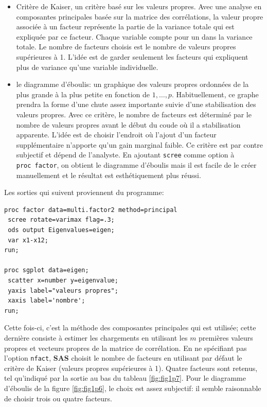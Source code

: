 \documentclass[
  11pt,
  letterpaper,
]{book}
\providecommand{\tightlist}{%
  \setlength{\itemsep}{0pt}\setlength{\parskip}{0pt}}
\theoremstyle{definition}
\theoremstyle{definition}
\theoremstyle{definition}
\theoremstyle{remark}
\begin{document}
\begin{itemize}
\tightlist
\item
  Critère de Kaiser, un critère basé sur les valeurs propres. Avec une analyse en composantes principales basée sur la matrice des corrélations, la valeur propre associée à un facteur représente la partie de la variance totale qui est expliquée par ce facteur. Chaque variable compte pour un dans la variance totale. Le nombre de facteurs choisis est le nombre de valeurs propres supérieures à 1. L'idée est de garder seulement les facteurs qui expliquent plus de variance qu'une variable individuelle.
\item
  le diagramme d'éboulis: un graphique des valeurs propres ordonnées de la plus grande à la plus petite en fonction de \(1, \ldots, p\). Habituellement, ce graphe prendra la forme d'une chute assez importante suivie d'une stabilisation des valeurs propres. Avec ce critère, le nombre de facteurs est déterminé par le nombre de valeurs propres avant le début du coude où il a stabilisation apparente. L'idée est de choisir l'endroit où l'ajout d'un facteur supplémentaire n'apporte qu'un gain marginal faible. Ce critère est par contre subjectif et dépend de l'analyste. En ajoutant \texttt{scree} comme option à \texttt{proc\ factor}, on obtient le diagramme d'éboulis mais il est facile de le créer manuellement et le résultat est esthétiquement plus réussi.
\end{itemize}

Les sorties qui suivent proviennent du programme:

\begin{verbatim}
proc factor data=multi.factor2 method=principal
 scree rotate=varimax flag=.3;
 ods output Eigenvalues=eigen;
 var x1-x12;
run; 

proc sgplot data=eigen;
 scatter x=number y=eigenvalue;
 yaxis label="valeurs propres";
 xaxis label='nombre';
run;
\end{verbatim}

Cette fois-ci, c'est la méthode des composantes principales qui est utilisée; cette dernière consiste à estimer les chargements en utilisant les \(m\) premières valeurs propres et vecteurs propres de la matrice de corrélation. En ne spécifiant pas l'option \texttt{nfact}, \textbf{SAS} choisit le nombre de facteurs en utilisant par défaut le critère de Kaiser (valeurs propres supérieures à 1). Quatre facteurs sont retenus, tel qu'indiqué par la sortie au bas du tableau \ref{fig:fig1p7}. Pour le diagramme d'éboulis de la figure \ref{fig:fig1p6}, le choix est assez subjectif: il semble raisonnable de choisir trois ou quatre facteurs.
\end{document}
